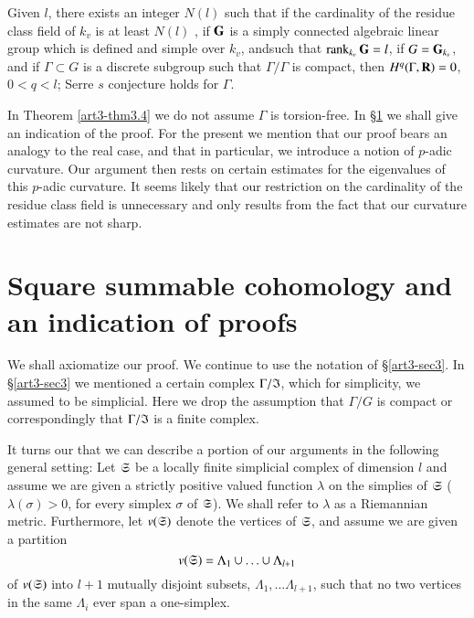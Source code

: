 \begin{theorem}\label{art3-thm3.4}
Given $l$, there exists an integer $N(l)$ such that if the cardinality of the residue class field of $k_v$ is at least $N(l)$ , if $\mathbf{G}$ is a simply connected algebraic linear group which is defined and simple over $k_v$, and\pageoriginale such that $\operatorname{rank}_{k_v} \mathbf{G} = l$, if $G = \mathbf{G}_{k_v}$, and if $\Gamma \subset G$ is a discrete subgroup such that $\Gamma/ \Gamma $ is compact, then $H^q(\Gamma, \mathbf{R}) =0$, $0 < q < l$; \iec Serre $s$ conjecture holds for $\Gamma$.
\end{theorem}

\begin{remark*}
In Theorem \ref{art3-thm3.4} we do not assume $\Gamma$ is torsion-free. In \S \ref{art3-sec4} we shall give an indication of the proof. For the present we mention that our proof bears an analogy to the real case, and that in particular, we introduce a notion of $p$-adic curvature. Our argument then rests on certain estimates for the eigenvalues of this $p$-adic curvature. It seems likely that our restriction on the cardinality of the residue class field is unnecessary and only results from the fact that our curvature estimates are not sharp.
\end{remark*}

\section{Square summable cohomology and an indication of proofs}\label{art3-sec4}
We shall axiomatize our proof. We continue to use the notation of \S \ref{art3-sec3}. In \S\ref{art3-sec3} we mentioned a certain complex $\Gamma/\mathfrak{I}$, which for simplicity, we assumed to be simplicial. Here we drop the assumption that $\Gamma/G$ is compact or correspondingly that $\Gamma/\mathfrak{I}$ is a finite complex.

It turns our that we can describe a portion of our arguments in the following general setting: Let $\mathfrak{S}$ be a locally finite simplicial complex of dimension $l$ and assume we are given a strictly positive valued function $\lambda$ on the simplies of $\mathfrak{S}$ ($\lambda(\sigma) > 0$, for every simplex $\sigma$ of $\mathfrak{S}$). We shall refer to $\lambda$ as a Riemannian metric. Furthermore, let $v (\mathfrak{S})$ denote the vertices of $\mathfrak{S}$, and assume we are given a partition
\setcounter{equation}{0}
\begin{equation}
v (\mathfrak{S}) = \Lambda_1 \cup \ldots \cup \Lambda_{l+1} \label{art3-eq4.1}
\end{equation}
of $v (\mathfrak{S})$ into $l+1$ mutually disjoint subsets, $\Lambda_1, \ldots \Lambda_{l+1}$, such that no two vertices in the same $\Lambda_i$ ever span a one-simplex.

